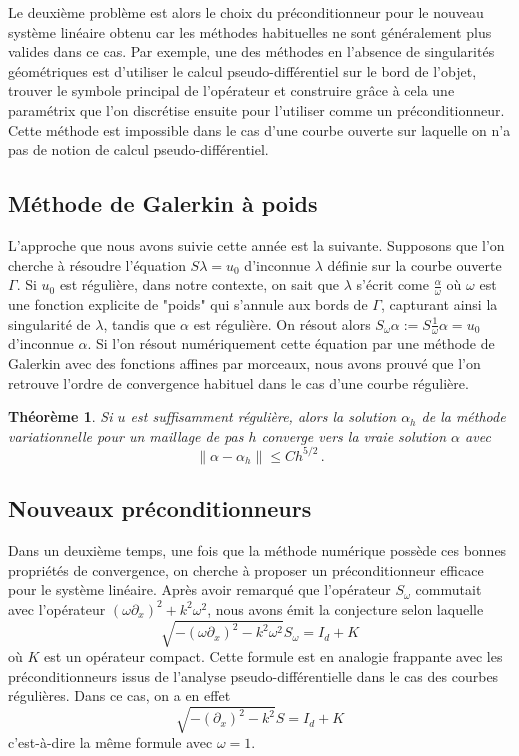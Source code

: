\documentclass[utf8]{article}
\newtheorem{The}{Théorème}
\begin{document}
	Le deuxième problème est alors le choix du préconditionneur pour le nouveau système linéaire obtenu car les méthodes habituelles ne sont généralement plus valides dans ce cas. Par exemple, une des méthodes en l'absence de singularités géométriques est d'utiliser le calcul pseudo-différentiel sur le bord de l'objet, trouver le symbole principal de l'opérateur et construire grâce à cela une paramétrix que l'on discrétise ensuite pour l'utiliser comme un préconditionneur. Cette méthode est impossible dans le cas d'une courbe ouverte sur laquelle on n'a pas de notion de calcul pseudo-différentiel. 
	
	\subsection{Méthode de Galerkin à poids}
	
	L'approche que nous avons suivie cette année est la suivante. Supposons que l'on cherche à résoudre l'équation $S \lambda  = u_0$ d'inconnue $\lambda$ définie sur la courbe ouverte $\Gamma$. Si $u_0$ est régulière, dans notre contexte, on sait que $\lambda$ s'écrit come $\frac{\alpha}{\omega}$ où $\omega$ est une fonction explicite de "poids" qui s'annule aux bords de $\Gamma$, capturant ainsi la singularité de $\lambda$, tandis que $\alpha$ est régulière. On résout alors $S_\omega\alpha := S\frac{1}{\omega} \alpha = u_0$ d'inconnue $\alpha$. Si l'on résout numériquement cette équation par une méthode de Galerkin avec des fonctions affines par morceaux, nous avons prouvé que l'on retrouve l'ordre de convergence habituel dans le cas d'une courbe régulière. 
	\begin{The}
		Si $u$ est suffisamment régulière, alors la solution $\alpha_h$ de la mé\-thode variationnelle pour un maillage de pas $h$ converge vers la vraie solution $\alpha$ avec 
		\[\|\alpha - \alpha_h\| \leq C h^{5/2} \,.\]
	\end{The}
	
	\subsection{Nouveaux préconditionneurs}
	
	Dans un deuxième temps, une fois que la méthode numérique possède ces bonnes propriétés de convergence, on cherche à proposer un préconditionneur efficace pour le système linéaire. Après avoir remarqué que l'opérateur $S_\omega$ commutait avec l'opérateur $(\omega \partial_x)^2 + k^2\omega^2$, nous avons émit la conjecture selon laquelle 
	\[\sqrt{-(\omega \partial_x)^2 - k^2\omega^2} S_\omega = I_d + K\]
	où $K$ est un opérateur compact. Cette formule est en analogie frappante avec les préconditionneurs issus de l'analyse pseudo-différentielle dans le cas des courbes régulières. Dans ce cas, on a en effet
	\[\sqrt{-(\partial_x)^2 - k^2} S = I_d + K\]
	c'est-à-dire la même formule avec $\omega = 1$. 
	
\end{document}
